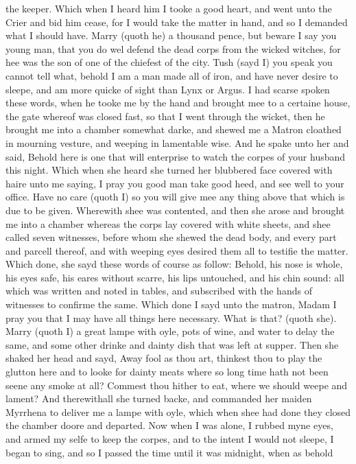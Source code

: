 the keeper. Which when I heard him I tooke a good heart, and went unto the
Crier and bid him cease, for I would take the matter in hand, and so I demanded
what I should have. Marry (quoth he) a thousand pence, but beware I say you
young man, that you do wel defend the dead corps from the wicked witches, for
hee was the son of one of the chiefest of the city. Tush (sayd I) you speak you
cannot tell what, behold I am a man made all of iron, and have never desire to
sleepe, and am more quicke of sight than Lynx or Argus. I had scarse spoken
these words, when he tooke me by the hand and brought mee to a certaine house,
the gate whereof was closed fast, so that I went through the wicket, then he
brought me into a chamber somewhat darke, and shewed me a Matron cloathed in
mourning vesture, and weeping in lamentable wise. And he spake unto her and
said, Behold here is one that will enterprise to watch the corpes of your
husband this night. Which when she heard she turned her blubbered face covered
with haire unto me saying, I pray you good man take good heed, and see well to
your office. Have no care (quoth I) so you will give mee any thing above that
which is due to be given. Wherewith shee was contented, and then she arose and
brought me into a chamber whereas the corps lay covered with white sheets, and
shee called seven witnesses, before whom she shewed the dead body, and every
part and parcell thereof, and with weeping eyes desired them all to testifie
the matter. Which done, she sayd these words of course as follow: Behold, his
nose is whole, his eyes safe, his eares without scarre, his lips untouched, and
his chin sound: all which was written and noted in tables, and subscribed with
the hands of witnesses to confirme the same. Which done I sayd unto the matron,
Madam I pray you that I may have all things here necessary. What is that?
(quoth she). Marry (quoth I) a great lampe with oyle, pots of wine, and water
to delay the same, and some other drinke and dainty dish that was left at
supper. Then she shaked her head and sayd, Away fool as thou art, thinkest thou
to play the glutton here and to looke for dainty meats where so long time hath
not been seene any smoke at all? Commest thou hither to eat, where we should
weepe and lament? And therewithall she turned backe, and commanded her maiden
Myrrhena to deliver me a lampe with oyle, which when shee had done they closed
the chamber doore and departed. Now when I was alone, I rubbed myne eyes, and
armed my selfe to keep the corpes, and to the intent I would not sleepe, I
began to sing, and so I passed the time until it was midnight, when as behold

